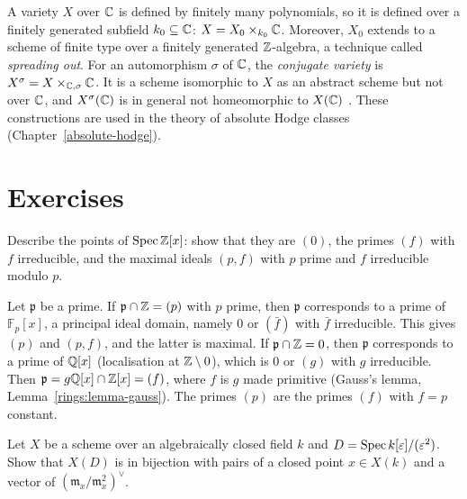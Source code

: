 \begin{remark}\label{schemes:remark-spreading-out}
A variety $X$ over $\mathbb{C}$ is defined by finitely many polynomials, so it is defined over a finitely generated subfield $k_0 \subseteq \mathbb{C}$: $X = X_0 \times_{k_0}\mathbb{C}$.
Moreover, $X_0$ extends to a scheme of finite type over a finitely generated $\mathbb{Z}$-algebra, a technique called \emph{spreading out}. For an automorphism
$\sigma$ of $\mathbb{C}$, the \emph{conjugate variety} is $X^\sigma = X \times_{\mathbb{C},\sigma}\mathbb{C}$. It is a scheme isomorphic to $X$ as an abstract scheme but not
over $\mathbb{C}$, and $X^\sigma(\mathbb{C})$ is in general not homeomorphic to $X(\mathbb{C})$ \cite{serre-1964}. These constructions are used in the theory of absolute Hodge
classes (Chapter~\ref{absolute-hodge}).
\end{remark}

\section{Exercises}\label{schemes:section-exercises}

\begin{exercise}\label{schemes:exercise-spec-z-x}
Describe the points of $\operatorname{Spec}\mathbb{Z}[x]$: show that they are $(0)$, the primes $(f)$ with $f$ irreducible, and the maximal ideals $(p, f)$ with $p$ prime and
$f$ irreducible modulo $p$.
\end{exercise}

\begin{solution}
Let $\mathfrak{p}$ be a prime. If $\mathfrak{p} \cap \mathbb{Z} = (p)$ with $p$ prime, then $\mathfrak{p}$ corresponds to a prime of $\mathbb{F}_p[x]$, a principal ideal domain,
namely $0$ or $(\bar f)$ with $\bar f$ irreducible. This gives $(p)$ and $(p, f)$, and the latter is maximal. If $\mathfrak{p} \cap \mathbb{Z} = 0$, then $\mathfrak{p}$
corresponds to a prime of $\mathbb{Q}[x]$ (localisation at $\mathbb{Z} \setminus 0$), which is $0$ or $(g)$ with $g$ irreducible. Then $\mathfrak{p} = g\mathbb{Q}[x] \cap \mathbb{Z}[x] = (f)$,
where $f$ is $g$ made primitive (Gauss's lemma, Lemma~\ref{rings:lemma-gauss}). The primes $(p)$ are the primes $(f)$ with $f = p$ constant.
\end{solution}

\begin{exercise}\label{schemes:exercise-dual-numbers}
Let $X$ be a scheme over an algebraically closed field $k$ and $D = \operatorname{Spec} k[\varepsilon]/(\varepsilon^2)$. Show that $X(D)$ is in bijection with pairs of a closed
point $x \in X(k)$ and a vector of $(\mathfrak{m}_x/\mathfrak{m}_x^2)^\vee$.
\end{exercise}

